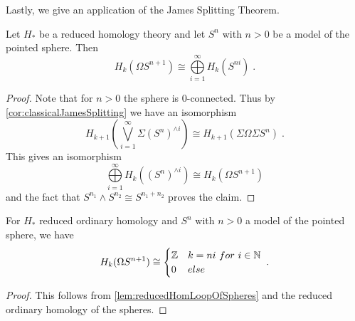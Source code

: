Lastly, we give an application of the James Splitting Theorem.
\begin{lemma}\label{lem:reducedHomLoopOfSpheres}
    Let $H_*$ be a reduced homology theory and let $S^n$ with $n>0$ be a model of the pointed sphere.
    Then
    \begin{equation*}
        H_k(\Omega S^{n+1})\cong\bigoplus\limits_{i=1}^{\infty}H_k(S^{ni})\;.
    \end{equation*}
    \begin{proof}
        Note that for $n>0$ the sphere is $0$-connected.
        Thus by \cref{cor:classicalJamesSplitting} we have an isomorphism 
        \begin{equation*}
            H_{k+1}\left(\bigvee\limits_{i=1}^{\infty}\Sigma \left(S^n\right)^{\wedge i}\right)\cong H_{k+1}\left(\Sigma\Omega\Sigma S^n\right)\;.
        \end{equation*}
        This gives an isomorphism
        \begin{equation*}
            \bigoplus\limits_{i=1}^{\infty}H_k\left(\left(S^n\right)^{\wedge i}\right)\cong H_k\left(\Omega S^{n+1}\right)
        \end{equation*}
        and the fact that $S^{n_1}\wedge S^{n_2}\cong S^{n_1+n_2}$ proves the claim.
    \end{proof}
\end{lemma}
\begin{corollary}
    For $H_*$ reduced ordinary homology and $S^n$ with $n>0$ a model of the pointed sphere, we have
    \begin{equation*}
        H_k(\Omega S^{n+1})\cong
        \begin{cases}
            \mathbb{Z} & k=ni ~for~ i\in\mathbb{N}\\
            0 & else
        \end{cases}\;.
    \end{equation*}
    \begin{proof}
        This follows from \cref{lem:reducedHomLoopOfSpheres} and the reduced ordinary homology of the spheres.
    \end{proof}
\end{corollary}
